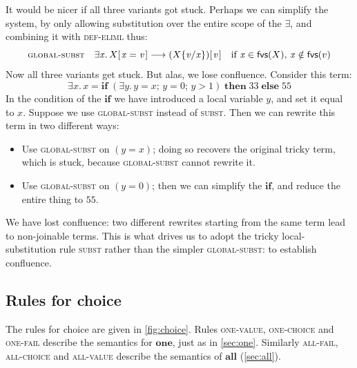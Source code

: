 \documentclass[acmsmall,review,dvipsnames]{acmart}
\newcommand{\Varid}[1]{\mathit{#1}}
\newcommand{\rulename}[1]{\textsc{\small #1}}
\newcommand{\freevars}[1]{\mathsf{fvs}(#1)}
\newcommand{\subst}[3]{#1\{#3/#2\}}
\newcommand{\movesto}{\longrightarrow}
\begin{document}
It would be nicer if all three variants got stuck. Perhaps we can simplify the system, by only allowing
substitution over the entire scope of the \ensuremath{\exists}, and combining it with \rulename{def-eliml} thus:
$$
\rulename{global-subst} \quad \ensuremath{\exists\Varid{x}.\,X [\mskip1.5mu \Varid{x}=\Varid{v}\mskip1.5mu]}  \movesto  \ensuremath{(\subst{X}{\Varid{x}}{\Varid{v}}) [\mskip1.5mu \Varid{v}\mskip1.5mu]}
        \quad \text{if $\ensuremath{\Varid{x}} \in \freevars{X}$, $\ensuremath{\Varid{x}} \notin \freevars{v}$} \\
$$
Now all three variants get stuck.  But alas, we lose confluence.  Consider this term:
$$
\ensuremath{\exists\Varid{x}.\,\Varid{x}\mathrel{=}\textbf{if}\;(\exists\Varid{y}.\,\Varid{y}\mathrel{=}\Varid{x};\,\Varid{y}\mathrel{=}\mathrm{0};\,\Varid{y}\mathbin{>}\mathrm{1})\;\textbf{then}\;\mathrm{33}\;\textbf{else}\;\mathrm{55}}
$$
In the condition of the \ensuremath{\textbf{if}} we have introduced a local variable \ensuremath{\Varid{y}}, and set it equal to \ensuremath{\Varid{x}}.
Suppose we use \rulename{global-subst} instead of \rulename{subst}.  Then we can rewrite this term in two
different ways:
\begin{itemize}
\item Use \rulename{global-subst} on \ensuremath{(\Varid{y}\mathrel{=}\Varid{x})}; doing so recovers the original tricky term, which is
stuck, because \rulename{global-subst} cannot rewrite it.
\item Use \rulename{global-subst} on \ensuremath{(\Varid{y}\mathrel{=}\mathrm{0})}; then we can simplify the \ensuremath{\textbf{if}}, and reduce the entire thing to \ensuremath{\mathrm{55}}.
\end{itemize}
We have lost confluence: two different rewrites starting from the same term lead to non-joinable terms.
This is what drives us to adopt the tricky local-substitution rule \rulename{subst} rather than
the simpler \rulename{global-subst}: to establish confluence.

\figureRulesII

\subsection{Rules for choice} \label{sec:choice-rules}

The rules for choice are given in \cref{fig:choice}.
Rules \rulename{one-value}, \rulename{one-choice}
and \rulename{one-fail} describe the semantics for \ensuremath{\textbf{one}}, just as in \cref{sec:one}.
Similarly \rulename{all-fail}, \rulename{all-choice} and \rulename{all-value} describe
the semantics of \ensuremath{\textbf{all}} (\cref{sec:all}).
\end{document}
